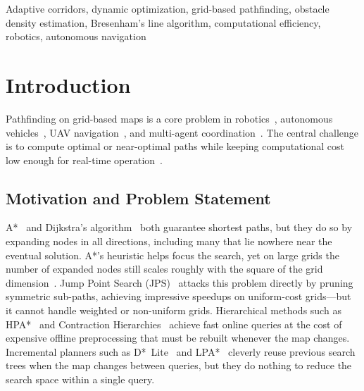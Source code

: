 \documentclass[journal]{IEEEtran}
\begin{document}
\begin{IEEEkeywords}
Adaptive corridors, dynamic optimization, grid-based pathfinding, obstacle density estimation, Bresenham's line algorithm, computational efficiency, robotics, autonomous navigation
\end{IEEEkeywords}

\section{Introduction}

Pathfinding on grid-based maps is a core problem in robotics~\cite{lavalle2006planning,siciliano2016springer}, autonomous vehicles~\cite{paden2016survey,gonzalez2015review}, UAV navigation~\cite{goerzen2010survey,majeed2024uav,yang2023uav}, and multi-agent coordination~\cite{stern2019mapf}. The central challenge is to compute optimal or near-optimal paths while keeping computational cost low enough for real-time operation~\cite{bento2021autonomous}.

\subsection{Motivation and Problem Statement}

A*~\cite{hart1968formal} and Dijkstra's algorithm~\cite{dijkstra1959note} both guarantee shortest paths, but they do so by expanding nodes in all directions, including many that lie nowhere near the eventual solution.
A*'s heuristic helps focus the search, yet on large grids the number of expanded nodes still scales roughly with the square of the grid dimension~\cite{sturtevant2012benchmarks}.
Jump Point Search (JPS)~\cite{harabor2011online} attacks this problem directly by pruning symmetric sub-paths, achieving impressive speedups on uniform-cost grids---but it cannot handle weighted or non-uniform grids.
Hierarchical methods such as HPA*~\cite{botea2004near} and Contraction Hierarchies~\cite{geisberger2008contraction} achieve fast online queries at the cost of expensive offline preprocessing that must be rebuilt whenever the map changes.
Incremental planners such as D*~Lite~\cite{koenig2002d} and LPA*~\cite{koenig2004lifelong} cleverly reuse previous search trees when the map changes between queries, but they do nothing to reduce the search space within a single query.
\end{document}
